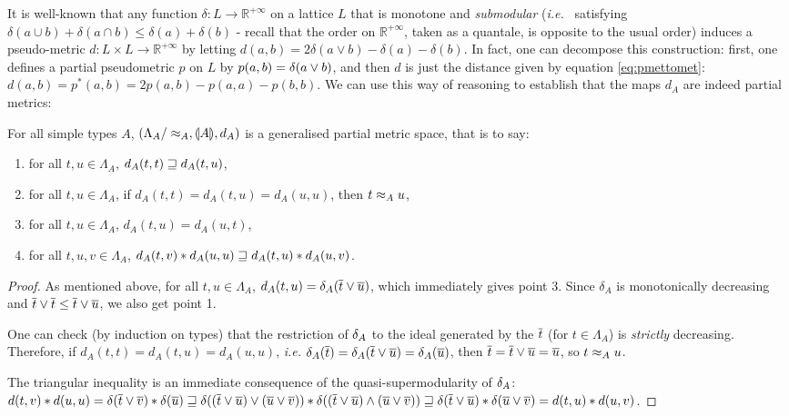 It is well-known  \cite{6845021} that any 
function $\delta: L\to \mathbb R^{+\infty}$ on a lattice $L$ that is monotone and \emph{submodular}  (\emph{i.e.}~ satisfying $\delta(a\cup b)+ \delta(a\cap b) \leq \delta(a)+\delta(b)$ - recall that the order on $\mathbb R^{+\infty}$, taken as a quantale, is opposite to the usual order) induces a pseudo-metric $d: L\times L \to \mathbb R^{+\infty}$ by letting $d(a,b)=2\delta(a\vee b)-\delta(a)-\delta(b)$. In fact, one can decompose this construction: first, one defines a partial pseudometric $p$ on $L$ by $p(a,b) = \delta(a \vee b)$, and then $d$ is just the distance given by equation \eqref{eq:pmettomet}: $d(a,b) = p^*(a,b) = 2p(a,b)-p(a,a)-p(b,b)$. We can use this way of reasoning to establish that the maps $d_{A}$ are indeed partial metrics:

\begin{corollary} \label{corollary:stlc-metric} For all simple types $A$, $\left(\Lambda_A/\approx_A, \llparenthesis A \rrparenthesis, d_A\right)$ is a generalised partial metric space, that is to say:
\begin{enumerate}
\item for all $t,u \in \Lambda_A$, $d_A(t,t) \sqsupseteq d_A(t,u)$,
\item for all $t,u \in \Lambda_A$, if $d_A(t,t) = d_A(t,u) = d_A(u,u)$, then $t \approx_A u$,
\item for all $t,u \in \Lambda_A$, $d_A(t,u) = d_A(u,t)$,
\item for all $t,u,v \in \Lambda_A$, $d_A(t,v) \mathbin{\ast} d_A(u,u) \sqsupseteq d_A(t,u) \mathbin{\ast} d_A(u,v)$.
\end{enumerate}
\end{corollary}
\begin{proof}
As mentioned above, for all $t,u\in\Lambda_A$, $d_A(t,u) = \delta_A(\overline{t} \vee \overline{u})$, which immediately gives point 3. Since $\delta_A$ is monotonically decreasing and $\overline{t} \vee \overline{t} \leq \overline{t} \vee \overline{u}$, we also get point 1.

One can check (by induction on types) that the restriction of $\delta_A$ to the ideal generated by the $\overline{t}$ (for $t \in \Lambda_A$) is \emph{strictly} decreasing. Therefore, if  $d_A(t,t) = d_A(t,u) = d_A(u,u)$, \textit{i.e.} $\delta_A(\overline{t}) = \delta_A(\overline{t} \vee \overline{u}) = \delta_A(\overline{u})$,  then $\overline{t} = \overline{t} \vee \overline{u} = \overline{u}$, so $t \approx_A u$.

The triangular inequality is an immediate consequence of the quasi-supermodularity of $\delta_A$: $d(t,v) \mathbin{\ast} d(u,u) = \delta(\overline{t} \vee \overline{v}) \mathbin{\ast} \delta(\overline{u}) \sqsupseteq \delta((\overline{t} \vee \overline{u}) \vee (\overline{u} \vee \overline{v})) \mathbin{\ast} \delta((\overline{t} \vee \overline{u}) \wedge (\overline{u} \vee \overline{v})) \sqsupseteq \delta(\overline{t} \vee  \overline{u}) \mathbin{\ast} \delta(\overline{u} \vee  \overline{v}) = d(t,u) \mathbin{\ast} d(u,v)$.
\end{proof}

